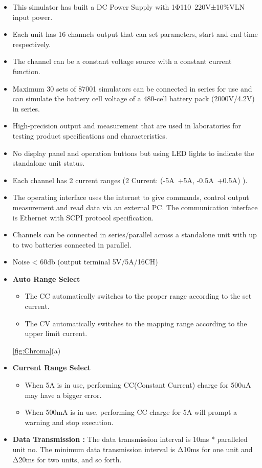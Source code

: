 \begin{itemize}
    \item This simulator has built a DC Power Supply with 1Φ110~220V±10$\%$VLN input power.
    \item Each unit has 16 channels output that can set parameters, start and end time respectively.
    \item The channel can be a constant voltage source with a constant current function.
    \item Maximum 30 sets of 87001 simulators can be connected in series for use and can simulate the battery cell voltage of a 480-cell battery pack (2000V/4.2V) in series.
    \item High-precision output and measurement that are used in laboratories for testing product specifications and characteristics.
    \item No display panel and operation buttons but using LED lights to indicate the standalone unit status.
    \item Each channel has 2 current ranges (2 Current: (-5A~+5A, -0.5A~+0.5A) ).
    \item The operating interface uses the internet to give commands, control output measurement and read data via an external PC. The communication interface is Ethernet with SCPI protocol specification.
    \item Channels can be connected in series/parallel across a standalone unit with up to two batteries connected in parallel.
    \item Noise < 60db (output terminal 5V/5A/16CH)
    \item \textbf{Auto Range Select }
            \begin{itemize}
                \item The CC automatically switches to the proper range according to the set current.
                \item The CV automatically switches to the mapping range according to the upper limit current.
            \end{itemize} \ref{fig:Chroma}(a)
    \item \textbf{Current Range Select }
            \begin{itemize}
                \item When 5A is in use, performing CC(Constant Current) charge for 500uA may have a bigger error.
                \item When 500mA is in use, performing CC charge for 5A will prompt a warning and stop execution.
            \end{itemize}

    \item \textbf{Data Transmission :} The data transmission interval is 10ms * paralleled unit no. The minimum data transmission interval is Δ10ms for one unit and Δ20ms for two units, and so forth.
    
\end{itemize}

